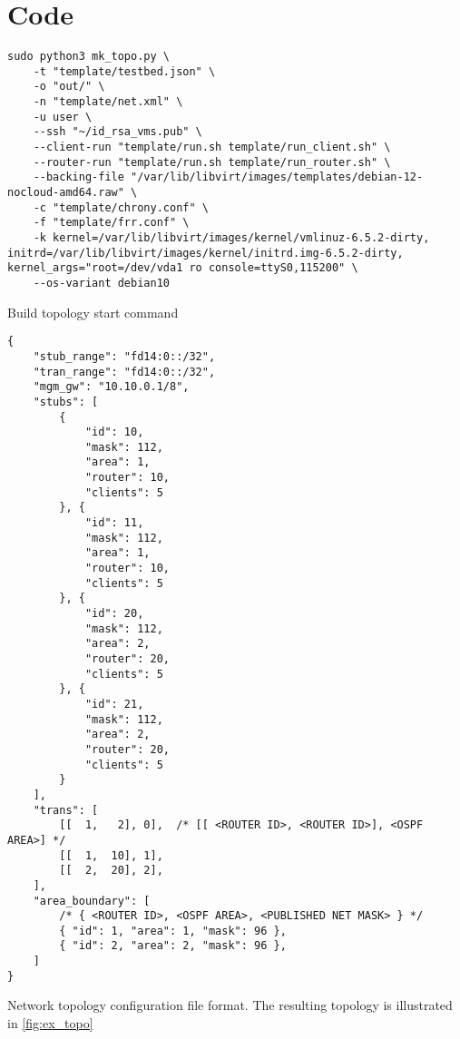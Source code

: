 \chapter{Code} %
\label{chap:Code}


\begin{listing}[h]
\begin{verbatim}
sudo python3 mk_topo.py \
    -t "template/testbed.json" \
    -o "out/" \
    -n "template/net.xml" \
    -u user \
    --ssh "~/id_rsa_vms.pub" \
    --client-run "template/run.sh template/run_client.sh" \
    --router-run "template/run.sh template/run_router.sh" \
    --backing-file "/var/lib/libvirt/images/templates/debian-12-nocloud-amd64.raw" \
    -c "template/chrony.conf" \
    -f "template/frr.conf" \
    -k kernel=/var/lib/libvirt/images/kernel/vmlinuz-6.5.2-dirty, initrd=/var/lib/libvirt/images/kernel/initrd.img-6.5.2-dirty, kernel_args="root=/dev/vda1 ro console=ttyS0,115200" \
    --os-variant debian10
\end{verbatim}
\caption{Build topology start command}
\label{lst:cmd_mk_topo_start}
\end{listing}

\begin{listing}[h]
\begin{verbatim}
{
    "stub_range": "fd14:0::/32",
    "tran_range": "fd14:0::/32",
    "mgm_gw": "10.10.0.1/8",
    "stubs": [
        {
            "id": 10,
            "mask": 112,
            "area": 1,
            "router": 10,
            "clients": 5
        }, {
            "id": 11,
            "mask": 112,
            "area": 1,
            "router": 10,
            "clients": 5
        }, {
            "id": 20,
            "mask": 112,
            "area": 2,
            "router": 20,
            "clients": 5
        }, {
            "id": 21,
            "mask": 112,
            "area": 2,
            "router": 20,
            "clients": 5
        }
    ],
    "trans": [
        [[  1,   2], 0],  /* [[ <ROUTER ID>, <ROUTER ID>], <OSPF AREA>] */
        [[  1,  10], 1],
        [[  2,  20], 2],
    ],
    "area_boundary": [
        /* { <ROUTER ID>, <OSPF AREA>, <PUBLISHED NET MASK> } */
        { "id": 1, "area": 1, "mask": 96 },
        { "id": 2, "area": 2, "mask": 96 },
    ]
}
\end{verbatim}
    \caption[Network topology configuration file format]{
        Network topology configuration file format.
        The resulting topology is illustrated in \autoref{fig:ex_topo}
    }
    \label{lst:topo_cfg_format}
\end{listing}

